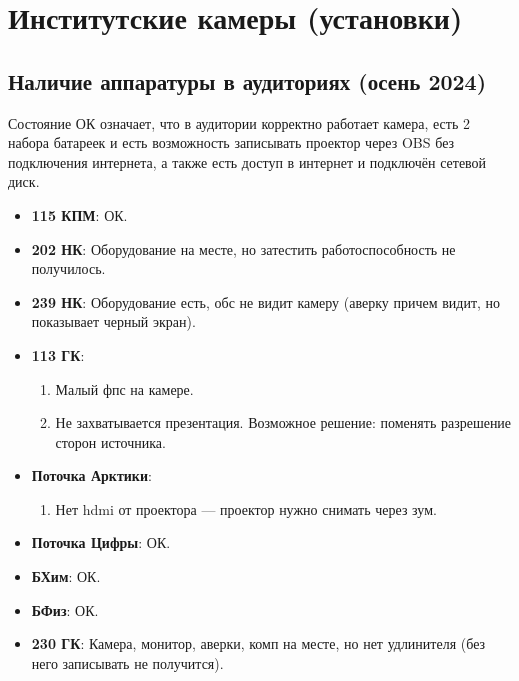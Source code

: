 \section{Институтские камеры (установки)}\label{sec:institution-camera}

\subsection{Наличие аппаратуры в аудиториях (осень 2024)}\label{ssec:equipment-availability}

Состояние ОК означает, что в аудитории корректно работает камера, есть 2 набора батареек и есть возможность записывать проектор через OBS без подключения интернета, а также есть доступ в интернет и подключён сетевой диск.

\begin{itemize}
  \item \textbf{115 КПМ}: ОК.

  \item \textbf{202 НК}: Оборудование на месте, но затестить работоспособность не получилось.

  \item \textbf{239 НК}: Оборудование есть, обс не видит камеру (аверку причем видит, но показывает черный экран).

  \item \textbf{113 ГК}:
        \begin{enumerate}[label=\alph*), noitemsep]
          \item Малый фпс на камере.
          \item Не захватывается презентация. Возможное решение: поменять разрешение сторон источника.
        \end{enumerate}

  \item \textbf{Поточка Арктики}:
        \begin{enumerate}[label=\alph*), noitemsep]
          \item Нет hdmi от проектора --- проектор нужно снимать через зум.
        \end{enumerate}

  \item \textbf{Поточка Цифры}: ОК.

  \item \textbf{БХим}: ОК.

  \item \textbf{БФиз}: ОК.

  \item \textbf{230 ГК}: Камера, монитор, аверки, комп на месте, но нет удлинителя (без него записывать не получится).
\end{itemize}

